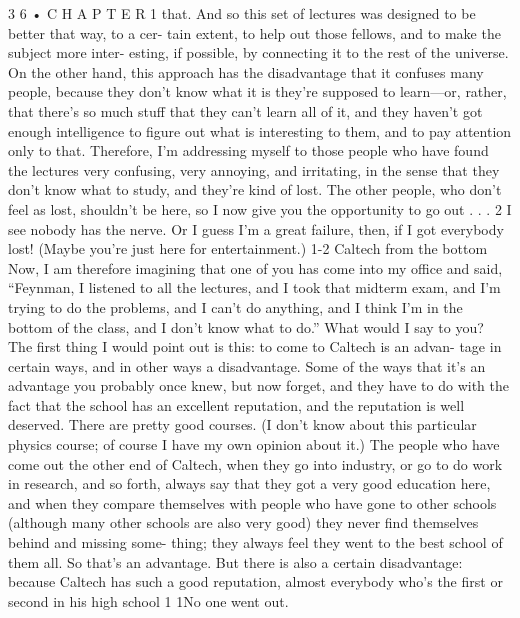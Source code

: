 \documentclass[10pt,oneside]{article}
\begin{document}
3 6 • C H A P T E R  1 that. And so this set of lectures was designed to be better that way, to a cer- tain extent, to help out those fellows, and to make the subject more inter- esting, if possible, by connecting it to the rest of the universe. On the other hand, this approach has the disadvantage that it confuses many people, because they don’t know what it is they’re supposed to learn---or, rather, that there’s so much stuff that they can’t learn all of it, and they haven’t got enough intelligence to figure out what is interesting to them, and to pay attention only to that. Therefore, I’m addressing myself to those people who have found the lectures very confusing, very annoying, and irritating, in the sense that they don’t know what to study, and they’re kind of lost. The other people, who don’t feel as lost, shouldn’t be here, so I now give you the opportunity to go out . . . 2 I see nobody has the nerve. Or I guess I’m a great failure, then, if I got everybody lost! (Maybe you’re just here for entertainment.) 1-2 Caltech from the bottom Now, I am therefore imagining that one of you has come into my office and said, “Feynman, I listened to all the lectures, and I took that midterm exam, and I’m trying to do the problems, and I can’t do anything, and I think I’m in the bottom of the class, and I don’t know what to do.” What would I say to you? The first thing I would point out is this: to come to Caltech is an advan- tage in certain ways, and in other ways a disadvantage. Some of the ways that it’s an advantage you probably once knew, but now forget, and they have to do with the fact that the school has an excellent reputation, and the reputation is well deserved. There are pretty good courses. (I don’t know about this particular physics course; of course I have my own opinion about it.) The people who have come out the other end of Caltech, when they go into industry, or go to do work in research, and so forth, always say that they got a very good education here, and when they compare themselves with people who have gone to other schools (although many other schools are also very good) they never find themselves behind and missing some- thing; they always feel they went to the best school of them all. So that’s an advantage. But there is also a certain disadvantage: because Caltech has such a good reputation, almost everybody who’s the first or second in his high school 1 1No one went out.\par
\end{document}
